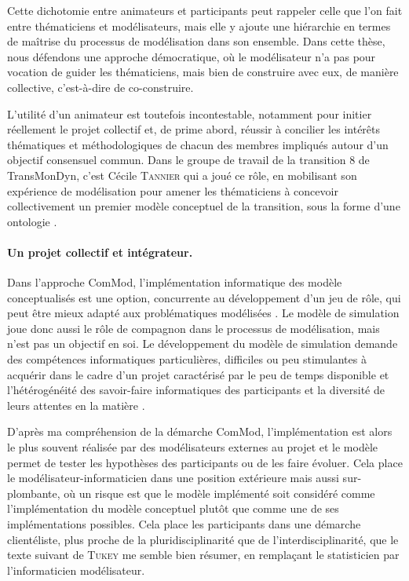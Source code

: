 Cette dichotomie entre \og animateurs\fg{} et \og participants\fg{} peut rappeler celle que l'on fait entre \og thématiciens\fg{} et \og modélisateurs\fg{}, mais elle y ajoute une hiérarchie en termes de maîtrise du processus de modélisation dans son ensemble.
Dans cette thèse, nous défendons une approche \og démocratique\fg{}, où le modélisateur n'a pas pour vocation de guider les thématiciens, mais bien de construire avec eux, de manière collective, c'est-à-dire de co-construire.

L'utilité d'un \og animateur\fg{} est toutefois incontestable, notamment pour initier réellement le projet collectif et, de prime abord, réussir à concilier les intérêts thématiques et méthodologiques de chacun des membres impliqués autour d'un objectif consensuel commun.
Dans le groupe de travail de la \og transition 8\fg{} de TransMonDyn, c'est Cécile \textsc{Tannier} qui a joué ce rôle, en mobilisant son expérience de modélisation pour amener les thématiciens à concevoir collectivement un premier modèle conceptuel de la transition, sous la forme d'une ontologie \autocite{tannier_ontologie_2014}.

\paragraph{Un projet collectif et intégrateur.}

Dans l'approche ComMod, l'implémentation informatique des modèle conceptualisés est une option, concurrente au développement d'un jeu de rôle, qui peut être mieux adapté aux problématiques modélisées \autocite[96-97]{etienne_modelisation_2015}.
Le modèle de simulation joue donc aussi le rôle de compagnon dans le processus de modélisation, mais n'est pas un objectif en soi.
Le développement du modèle de simulation demande des compétences informatiques particulières, difficiles ou peu stimulantes à acquérir dans le cadre d'un projet caractérisé par le \og peu de temps disponible et l'hétérogénéité des savoir-faire informatiques des participants et la diversité de leurs attentes en la matière\fg{} \autocite[29]{etienne_modelisation_2015}.

D'après ma compréhension de la démarche ComMod, l'implémentation est alors  le plus souvent réalisée par des modélisateurs externes au projet et le modèle permet de tester les hypothèses des participants ou de les faire évoluer.
Cela place le modélisateur-informaticien dans une position extérieure mais aussi sur-plombante, où un risque est que le modèle implémenté soit considéré comme \og l'implémentation\fg{} du modèle conceptuel plutôt que comme une de ses implémentations possibles.
Cela place les participants dans une démarche clientéliste, plus proche de la pluridisciplinarité que de l'interdisciplinarité, que le texte suivant de \textsc{Tukey} me semble bien résumer, en remplaçant le \og statisticien\fg{} par l'\og{}informaticien modélisateur\fg{}.

